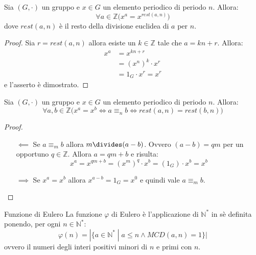 \begin{lemmabox}
	Sia $(G,\cdot)$ un gruppo e $x \in G$ un elemento periodico di periodo $n$. Allora:
	\begin{displaymath}
		\forall a \in \mathbb{Z} \bigl(x^{a} = x^{rest(a,n)}\bigr)
	\end{displaymath}
	dove $rest(a,n)$ è il resto della divisione euclidea di $a$ per $n$.
\end{lemmabox}
\begin{proof}
	Sia $r=rest(a,n)$ allora esiste un $k \in \mathbb{Z}$ tale che $a=kn+r$. Allora:
	\begin{align*}
		x^{a} &= x^{kn+r}\\
		&= (x^{n})^{k} \cdot x^{r}\\
		&= 1_{G}  \cdot x^{r} = x^{r}
	\end{align*}
	e l'asserto è dimostrato.
\end{proof}

\begin{propbox}
	Sia $(G,\cdot)$ un gruppo e $x \in G$ un elemento periodico di periodo $n$. Allora:
	\begin{displaymath}
		\forall a,b \in \mathbb{Z} \bigl(x^{a} = x^{b} \iff a \equiv_{n} b \iff rest(a,n) = rest(b,n)\bigr)
	\end{displaymath}
\end{propbox}
\begin{proof}
\begin{itemize}
		\item[$\impliedby$] Se $a \equiv_{m} b$ allora $m \divides (a-b)$. Ovvero $(a-b)= q m$ per un opportuno $q \in \mathbb{Z}$. Allora $a= q m+ b$ e risulta:
	\begin{displaymath}
		x^{a} = x^{qm +b} = (x^{m})^{q} \cdot x^{b} = (1_{G}) \cdot x^{b} = x^{b}
	\end{displaymath}
	\item[$\implies$] Se $x^{a} = x^{b}$ allora $x^{a-b}=1_{G} = x^{0}$ e quindi vale $a \equiv_{m} b$.
\end{itemize}
\end{proof}

\begin{defbox}{Funzione di Eulero}
	La funzione $\varphi$ di Eulero è l'applicazione di $\mathbb{N}^{*}$ in sè definita ponendo, per ogni $n \in \mathbb{N}^{*}$:
	\begin{equation}
		\varphi(n)=|\{a \in \mathbb{N}^{*} \; | \; a \leq n \land MCD(a,n)=1 \}|
	\end{equation}
	ovvero il numeri degli interi positivi minori di $n$ e primi con $n$.
	
\end{defbox}

